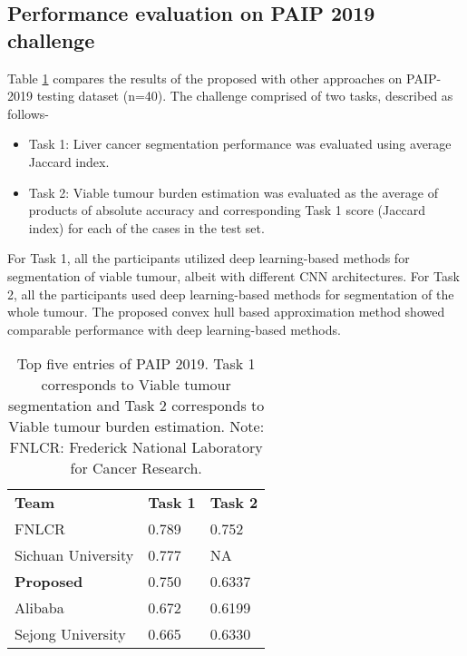 \documentclass[times,twocolumn,final,authoryear]{tmp}
\begin{document}
\subsection{Performance evaluation on PAIP 2019 challenge}
Table \ref{path_tab:paip_results} compares the results of the proposed with other approaches on PAIP-2019 testing dataset (n=40). The challenge comprised of two tasks,  described as follows-
\begin{itemize}
\item Task 1: Liver cancer segmentation performance was evaluated using average Jaccard index. 
\item Task 2: Viable tumour burden estimation was evaluated as the average of products of absolute accuracy and corresponding Task 1 score (Jaccard index) for each of the cases in the test set.
\end{itemize}
For Task 1, all the participants utilized deep learning-based methods for segmentation of viable tumour, albeit with different CNN architectures. For Task 2, all the participants used deep learning-based methods for segmentation of the whole tumour. The proposed convex hull based approximation method showed comparable performance with deep learning-based methods.


\begin{table}
\centering
\caption{Top five entries of PAIP 2019. Task 1 corresponds to Viable tumour segmentation and Task 2 corresponds to Viable tumour burden estimation. Note: FNLCR: Frederick National Laboratory for Cancer Research.}
\begin{tabular}{@{}lll@{}}
  
\textbf{Team}                                              & \textbf{Task 1} & \textbf{Task 2}  \\    
FNLCR & 0.789                 & 0.752                        \\
Sichuan University                                & 0.777                 & NA                           \\
\textbf{Proposed}                                              & 0.750                 & 0.6337                       \\
Alibaba                                 & 0.672                 & 0.6199                       \\
Sejong University                                 & 0.665                 & 0.6330                       \\  
\end{tabular}
\label{path_tab:paip_results}
\end{table}
\end{document}
